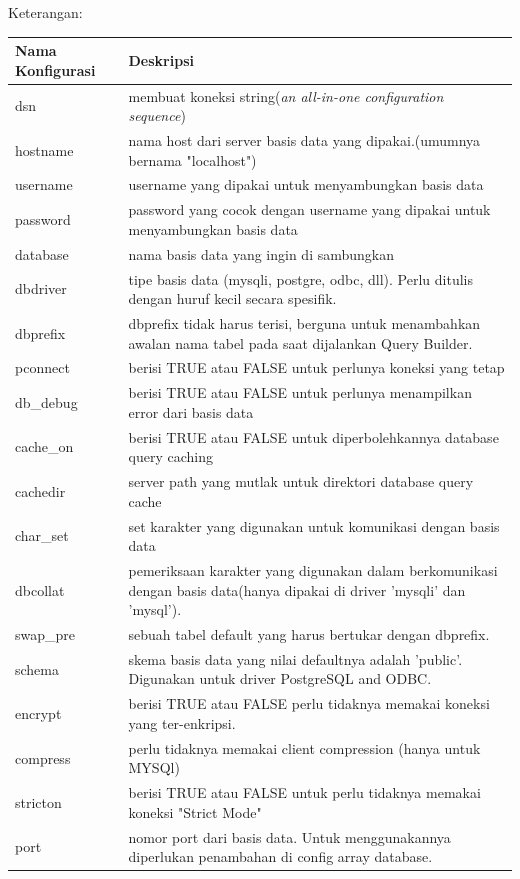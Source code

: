 	Keterangan:
	\begin{center}
	\begin{tabular}{| m{5cm} | m{10cm} |}
		\hline
		Nama Konfigurasi & Deskripsi\\
		\hline
		dsn & membuat koneksi string(\textit{an all-in-one configuration sequence})\\
		\hline
		hostname & nama host dari server basis data yang dipakai.(umumnya bernama "localhost")\\
		\hline
		username & username yang dipakai untuk menyambungkan basis data\\
		\hline
		password & password yang cocok dengan username yang dipakai untuk menyambungkan basis data\\
		\hline
		database & nama basis data yang ingin di sambungkan\\
		\hline
		dbdriver & tipe basis data (mysqli, postgre, odbc, dll). Perlu ditulis dengan huruf kecil secara spesifik.\\
		\hline
		dbprefix & dbprefix tidak harus terisi, berguna untuk menambahkan awalan nama tabel pada saat dijalankan Query Builder.\\
		\hline
		pconnect & berisi TRUE atau FALSE untuk perlunya koneksi yang tetap\\
		\hline
		db\_debug & berisi TRUE atau FALSE untuk perlunya menampilkan error dari basis data\\
		\hline
		cache\_on & berisi TRUE atau FALSE untuk diperbolehkannya database query caching\\
		\hline
		cachedir & server path yang mutlak untuk direktori database query cache\\
		\hline
		char\_set & set karakter yang digunakan untuk komunikasi dengan basis data\\
		\hline
		dbcollat & pemeriksaan karakter yang digunakan dalam berkomunikasi dengan basis data(hanya dipakai di driver 'mysqli' dan 'mysql').\\
		\hline
		swap\_pre & sebuah tabel default yang harus bertukar dengan dbprefix.\\
		\hline
		schema & skema basis data yang nilai defaultnya adalah 'public'. Digunakan untuk driver PostgreSQL and ODBC.\\
		\hline
		encrypt &  berisi TRUE atau FALSE perlu tidaknya memakai koneksi yang ter-enkripsi.\\
		\hline
		compress & perlu tidaknya memakai client compression (hanya untuk MYSQl)\\
		\hline
		stricton &  berisi TRUE atau FALSE untuk perlu tidaknya memakai koneksi "Strict Mode" \\
		\hline
		port & nomor port dari basis data. Untuk menggunakannya diperlukan penambahan di config array database.\\
		\hline
	\end{tabular}
\end{center}
	
